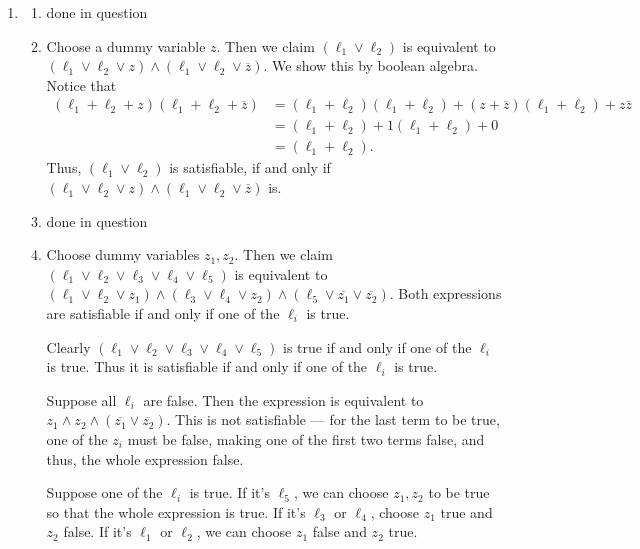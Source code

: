 \documentclass[12 pt, letterpaper]{hmcpset}
\begin{document}
\begin{solution}
	\begin{enumerate}[label = (\arabic*)]
		\item
			\begin{enumerate}[label = (\roman*)]
				\item done in question

				\item Choose a dummy variable $z$. Then we claim $(\ell_{1} \vee \ell_{2})$ is equivalent to $(\ell_{1} \vee \ell_{2} \vee z) \wedge (\ell_{1} \vee \ell_{2} \vee \overline{z})$. We show this by boolean algebra. Notice that
					\begin{align*}
						(\ell_{1} + \ell_{2} + z)(\ell_{1} + \ell_{2} + \overline{z}) & = (\ell_{1} + \ell_{2})(\ell_{1} + \ell_{2}) + (z + \overline{z})(\ell_{1} + \ell_{2}) + z \overline{z} \\
													      & = (\ell_{1} + \ell_{2}) + 1(\ell_{1} + \ell_{2}) + 0 \\
													      & = (\ell_{1} + \ell_{2}).
					\end{align*}
					Thus, $(\ell_{1} \vee \ell_{2})$ is satisfiable, if and only if $(\ell_{1} \vee \ell_{2} \vee z) \wedge (\ell_{1} \vee \ell_{2} \vee \overline{z})$ is.

				\item done in question

				\item Choose dummy variables $z_{1}, z_{2}$. Then we claim $(\ell_{1} \vee \ell_{2} \vee \ell_{3} \vee \ell_{4} \vee \ell_{5})$ is equivalent to $(\ell_{1} \vee \ell_{2} \vee z_{1}) \wedge (\ell_{3} \vee \ell_{4} \vee {z_{2}}) \wedge (\ell_{5} \vee \overline{z_{1}} \vee \overline{z_{2}})$. Both expressions are satisfiable if and only if one of the $\ell_{i}$ is true.

					Clearly $(\ell_{1} \vee \ell_{2} \vee \ell_{3} \vee \ell_{4} \vee \ell_{5})$ is true if and only if one of the $\ell_{i}$ is true. Thus it is satisfiable if and only if one of the $\ell_{i}$ is true.

					Suppose all $\ell_{i}$ are false. Then the expression is equivalent to $z_{1} \wedge {z_{2}} \wedge (\overline{z_{1}} \vee \overline{z_{2}})$. This is not satisfiable --- for the last term to be true, one of the $z_{i}$ must be false, making one of the first two terms false, and thus, the whole expression false.

					Suppose one of the $\ell_{i}$ is true. If it's $\ell_{5}$, we can choose $z_{1}, z_{2}$ to be true so that the whole expression is true. If it's $\ell_{3}$ or $\ell_{4}$, choose $z_{1}$ true and $z_{2}$ false. If it's $\ell_{1}$ or $\ell_{2}$, we can choose $z_{1}$ false and $z_{2}$ true.


\end{enumerate}
\end{enumerate}
\end{solution}
\end{document}
